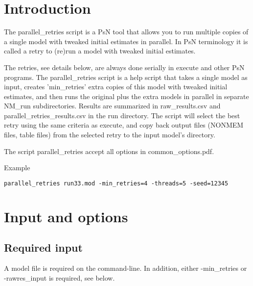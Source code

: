



\maketitle
\newcommand{\guidetoolname}{parallel\_retries}


\section{Introduction}
The parallel\_retries script is a PsN tool that allows you to run 
multiple copies of
a single model with tweaked initial estimates in parallel.
In PsN terminology it is called a retry to (re)run a model with tweaked 
initial estimates.

The retries, see details below, 
are always done serially in execute and other PsN programs. 
The parallel\_retries script is a help script that takes a single model 
as input, creates 'min\_retries' extra copies of this model 
with tweaked initial estimates, and then runs the original plus 
the extra models in parallel in separate NM\_run subdirectories. 
Results are summarized in raw\_results.csv and parallel\_retries\_results.csv
in the run directory. 
The script will select the best retry using the same criteria as execute,
and copy back output files (NONMEM files, table files) from the selected retry to the
input model's directory.

The script parallel\_retries accept all
options in common\_options.pdf. 

Example
\begin{verbatim}
parallel_retries run33.mod -min_retries=4 -threads=5 -seed=12345
\end{verbatim}

\section{Input and options}
\subsection{Required input}
A model file is required on the command-line. 
In addition, either -min\_retries or -rawres\_input is required, see below.

